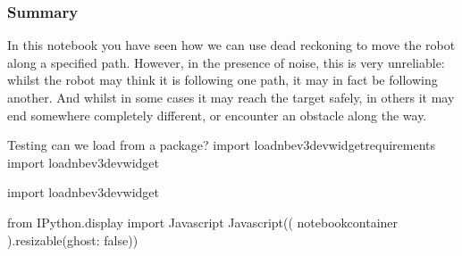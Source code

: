 \documentclass[letterpaper,10pt,english]{sphinxmanual}
\begin{document}
{\subsubsection{Summary}
\label{\detokenize{content/03_Robot_Lab/Section_00_02:Summary}}
In this notebook you have seen how we can use dead reckoning to move the robot along a specified path. However, in the presence of noise, this is very unreliable: whilst the robot may think it is following one path, it may in fact be following another. And whilst in some cases it may reach the target safely, in others it may end somewhere completely different, or encounter an obstacle along the way.

{
\begin{sphinxVerbatim}[commandchars=\\\{\}]
\llap{\color{nbsphinxin}[ ]:\,\hspace{\fboxrule}\hspace{\fboxsep}}\PYGZsh{}Testing  \PYGZhy{} can we load from a package?
\PYGZsh{}import \PYGZus{}load\PYGZus{}nbev3devwidget\PYGZus{}requirements
\PYGZsh{}\PYGZsh{}import \PYGZus{}load\PYGZus{}nbev3devwidget
\end{sphinxVerbatim}
}

{
\begin{sphinxVerbatim}[commandchars=\\\{\}]
\llap{\color{nbsphinxin}[ ]:\,\hspace{\fboxrule}\hspace{\fboxsep}}\PYGZsh{}import \PYGZus{}load\PYGZus{}nbev3devwidget
\end{sphinxVerbatim}
}

{
\begin{sphinxVerbatim}[commandchars=\\\{\}]
\llap{\color{nbsphinxin}[ ]:\,\hspace{\fboxrule}\hspace{\fboxsep}}\PYGZsh{}from IPython.display import Javascript
\PYGZsh{}Javascript(\PYGZsq{}\PYGZdl{}( \PYGZdq{}\PYGZsh{}notebook\PYGZhy{}container\PYGZdq{} ).resizable(\PYGZob{}ghost: false\PYGZcb{})\PYGZsq{})
\end{sphinxVerbatim}
}

}
\end{document}
